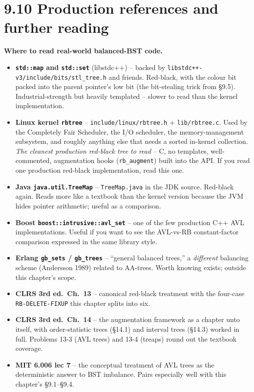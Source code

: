 \documentclass[11pt]{article}
\begin{document}
\section{9.10 Production references and further reading}

\begin{notebox}
\textbf{Where to read real-world balanced-BST code.}
\begin{itemize}[leftmargin=*]
    \item \textbf{\texttt{std::map} and \texttt{std::set}}
          (libstdc++) -- backed by
          \texttt{libstdc++-v3/include/bits/stl\_tree.h} and
          friends. Red-black, with the colour bit packed into the
          parent pointer's low bit (the bit-stealing trick from
          \S9.5). Industrial-strength but heavily templated --
          slower to read than the kernel implementation.
    \item \textbf{Linux kernel \texttt{rbtree}} --
          \texttt{include/linux/rbtree.h} +
          \texttt{lib/rbtree.c}. Used by the Completely Fair
          Scheduler, the I/O scheduler, the memory-management
          subsystem, and roughly anything else that needs a
          sorted in-kernel collection. \emph{The cleanest
          production red-black tree to read} -- C, no templates,
          well-commented, augmentation hooks (\texttt{rb\_augment})
          built into the API. If you read one production red-black
          implementation, read this one.
    \item \textbf{Java \texttt{java.util.TreeMap}} --
          \texttt{TreeMap.java} in the JDK source. Red-black
          again. Reads more like a textbook than the kernel
          version because the JVM hides pointer arithmetic; useful
          as a comparison.
    \item \textbf{Boost \texttt{boost::intrusive::avl\_set}} --
          one of the few production C++ AVL implementations.
          Useful if you want to see the AVL-vs-RB constant-factor
          comparison expressed in the same library style.
    \item \textbf{Erlang \texttt{gb\_sets} / \texttt{gb\_trees}}
          -- ``general balanced trees,'' a \emph{different} balancing
          scheme (Andersson 1989) related to AA-trees. Worth
          knowing exists; outside this chapter's scope.
    \item \textbf{CLRS 3rd ed.\ Ch.\ 13} -- canonical red-black
          treatment with the four-case \texttt{RB-DELETE-FIXUP}
          this chapter splits into six.
    \item \textbf{CLRS 3rd ed.\ Ch.\ 14} -- the augmentation
          framework as a chapter unto itself, with order-statistic
          trees (\S14.1) and interval trees (\S14.3) worked in
          full. Problems 13-3 (AVL trees) and 13-4 (treaps) round
          out the textbook coverage.
    \item \textbf{MIT 6.006 lec 7} -- the conceptual treatment of
          AVL trees as the deterministic answer to BST imbalance.
          Pairs especially well with this chapter's \S9.1--\S9.4.
\end{itemize}
\end{notebox}
\end{document}
